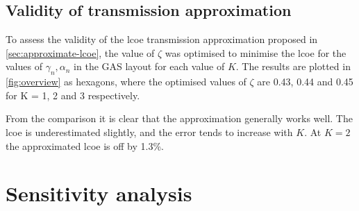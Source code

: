 \documentclass[a4paper, 5p, sort&compress]{elsarticle}%
\begin{document}
\subsection{Validity of transmission approximation}


To assess the validity of the \gls{lcoe} transmission approximation
proposed in \cref{sec:approximate-lcoe}, the value of $\zeta$ was
optimised to minimise the \gls{lcoe} for the values of $\gamma_n,\alpha_n$ in
the GAS layout for each value of $K$. The results are plotted in
\cref{fig:overview} as hexagons, where the optimised values
of $\zeta$  are 0.43, 0.44 and 0.45 for K = 1, 2 and 3 respectively.

From the comparison it is clear that the approximation generally works well. The \gls{lcoe} is
underestimated slightly, and the error tends to increase with $K$.
At $K=2$ the approximated \gls{lcoe} is off by 1.3\%.


\section{Sensitivity analysis}
\label{sec:sensitivity-analysis}
\end{document}
